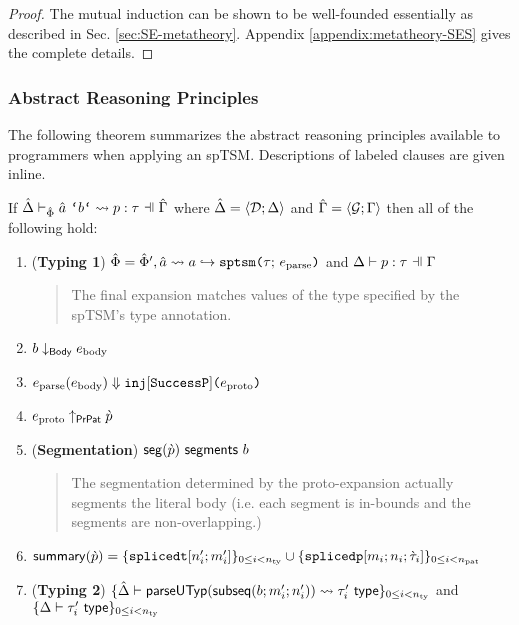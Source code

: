 {{{{\begin{proof}
The mutual induction can be shown to be well-founded essentially as described in Sec. \ref{sec:SE-metatheory}. Appendix \ref{appendix:metatheory-SES} gives the complete details.
\end{proof}

\subsubsection{Abstract Reasoning Principles}\label{sec:uptsms-abstract-reasoning-principles}
The following theorem summarizes the abstract reasoning principles available to programmers when applying an spTSM. Descriptions of labeled clauses are given inline.
\begingroup
\def\thetheorem{\ref{thm:spTSM-Typing-Segmentation}}
\begin{theorem}
If $\patExpands{\upctx}{\uPhi}{\utsmap{\tsmv}{b}}{p}{\tau}$ where $\hat{\Delta}=\langle \mathcal{D}; \Delta \rangle$ and $\hat{\Gamma}=\langle \mathcal{G}; \Gamma \rangle$ then all of the following hold:
\begin{enumerate}
        \item (\textbf{Typing 1}) $\hat\Phi=\hat\Phi', \hat{a} \leadsto a \hookrightarrow \texttt{sptsm}\texttt{(}\tau;\,e_\text{parse}\texttt{)}$ and $\patType{\pctx}{p}{\tau}$
          \begin{quote}
            The final expansion matches values of the type specified by the spTSM's type annotation.
          \end{quote}
        \item $b \downarrow_\mathsf{Body} e_\text{body}$
        \item $e_\text{parse}(e_\text{body}) \Downarrow \texttt{inj}[\mathtt{SuccessP}]\texttt{(}e_\text{proto}\texttt{)}$
        \item $e_\text{proto} \uparrow_\mathsf{PrPat} \grave{p}$
        \item (\textbf{Segmentation}) $\mathsf{seg}(\grave{p})~\mathsf{segments}~b$
          \begin{quote}
            The segmentation determined by the proto-expansion actually segments the literal body (i.e. each segment is in-bounds and the segments are non-overlapping.)
          \end{quote}
        \item $\mathsf{summary}(\grave{p}) = \{\texttt{splicedt}[n'_i; m'_i]\}_{0 \leq i < n_\text{ty}} \cup \{\texttt{splicedp}[m_i; n_i; \grave{\tau}_i]\}_{0 \leq i < n_\text{pat}}$
        \item (\textbf{Typing 2}) $\{
              \hat{\Delta} \vdash 
                \mathsf{parseUTyp}(\mathsf{subseq}(b; m'_i; n'_i))
               \leadsto \tau'_i~\mathsf{type}
            \}_{0 \leq i < n_\text{ty}}$ and $\{\Delta \vdash \tau'_i~\mathsf{type}\}_{0 \leq i < n_\text{ty}}$

\end{enumerate}
\end{theorem}}}}}
